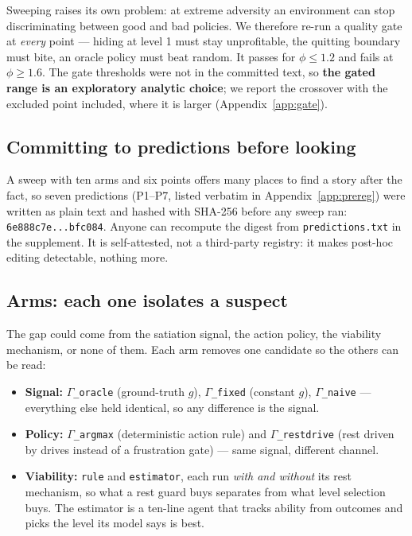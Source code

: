 \documentclass{article}
\begin{document}
Sweeping raises its own problem: at extreme adversity an environment can stop discriminating between good and bad policies. We therefore re-run a quality gate at \emph{every} point --- hiding at level 1 must stay unprofitable, the quitting boundary must bite, an oracle policy must beat random. It passes for $\phi\le1.2$ and fails at $\phi\ge1.6$. The gate thresholds were not in the committed text, so \textbf{the gated range is an exploratory analytic choice}; we report the crossover with the excluded point included, where it is larger (Appendix~\ref{app:gate}).

\subsection{Committing to predictions before looking}

A sweep with ten arms and six points offers many places to find a story after the fact, so seven predictions (P1--P7, listed verbatim in Appendix~\ref{app:prereg}) were written as plain text and hashed with SHA-256 before any sweep ran: \texttt{6e888c7e...bfc084}. Anyone can recompute the digest from \texttt{predictions.txt} in the supplement. It is self-attested, not a third-party registry: it makes post-hoc editing detectable, nothing more.

\subsection{Arms: each one isolates a suspect}

The gap could come from the satiation signal, the action policy, the viability mechanism, or none of them. Each arm removes one candidate so the others can be read:

\begin{itemize}\itemsep1pt
  \item \textbf{Signal:} \texttt{$\Gamma$\_oracle} (ground-truth $g$), \texttt{$\Gamma$\_fixed} (constant $g$), \texttt{$\Gamma$\_naive} --- everything else held identical, so any difference is the signal.
  \item \textbf{Policy:} \texttt{$\Gamma$\_argmax} (deterministic action rule) and \texttt{$\Gamma$\_restdrive} (rest driven by drives instead of a frustration gate) --- same signal, different channel.
  \item \textbf{Viability:} \texttt{rule} and \texttt{estimator}, each run \emph{with and without} its rest mechanism, so what a rest guard buys separates from what level selection buys. The estimator is a ten-line agent that tracks ability from outcomes and picks the level its model says is best.
\end{itemize}
\end{document}
